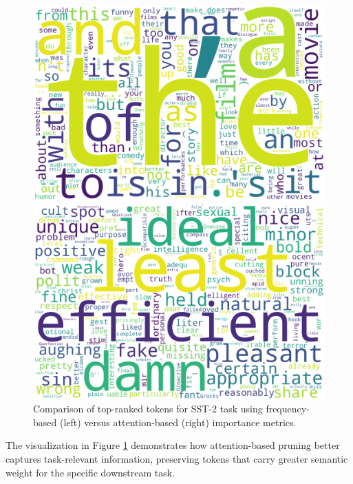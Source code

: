 \documentclass[twocolumn]{article}
\begin{document}
\begin{figure}[t]
\centering
\begin{minipage}{0.48\textwidth}
  \centering
  \includegraphics[width=\textwidth]{images/wordcloud_frequency.png}
\end{minipage}%
\hfill
\begin{minipage}{0.48\textwidth}
  \centering
  \includegraphics[width=\textwidth]{images/wordcloud_attention.png}
\end{minipage}
\caption{Comparison of top-ranked tokens for SST-2 task using frequency-based (left) versus attention-based (right) importance metrics.}
\label{fig:wordcloud-comparison}
\end{figure}
The visualization in Figure \ref{fig:wordcloud-comparison} demonstrates how attention-based pruning better captures task-relevant information, preserving tokens that carry greater semantic weight for the specific downstream task.
\end{document}
